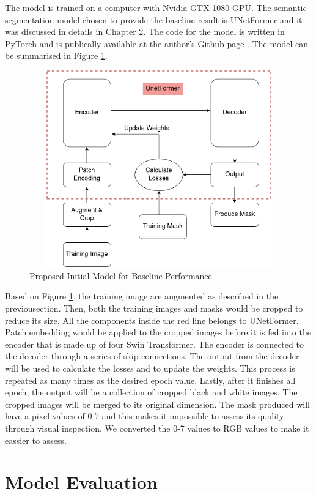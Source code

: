 The model is trained on a computer with Nvidia GTX 1080 GPU. The semantic segmentation model chosen to provide the baseline result is UNetFormer \cite{unetformer} and it was discussed in details in Chapter 2. The code for the model is written in PyTorch and is publically available at the author's Github page \href{https://github.com/WangLibo1995/GeoSeg}. The model can be summarised in Figure \ref{fig:initial-model}.

\begin{figure}[!h]
\includegraphics[width=13.0cm, height=8.5cm]{images/initial model.png}
\caption{Proposed Initial Model for Baseline Performance}
\label{fig:initial-model}
\end{figure}

Based on Figure \ref{fig:initial-model}, the training image are augmented as described in the previousection. Then, both the training images and masks would be cropped to reduce its size. All the components inside the red line belongs to UNetFormer. Patch embedding would be applied to the cropped images before it is fed into the encoder that is made up of four Swin Transformer. The encoder is connected to the decoder through a series of skip connections. The output from the decoder will be used to calculate the losses and to update the weights. This process is repeated as many times as the desired epoch value. Lastly, after it finishes all epoch, the output will be a collection of cropped black and white images. The cropped images will be merged to its original dimension. The mask produced will have a pixel values of 0-7 and this makes it impossible to assess its quality through visual inspection. We converted the 0-7 values to RGB values to make it eassier to assess. 
\section{Model Evaluation}

